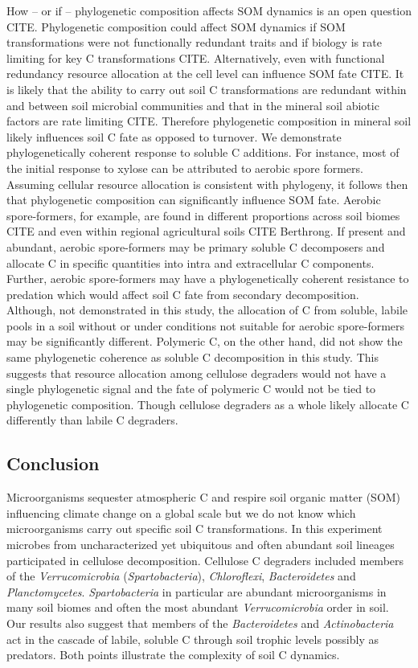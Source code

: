 How -- or if -- phylogenetic composition affects SOM dynamics is an open
question CITE. Phylogenetic composition could affect SOM dynamics if SOM
transformations were not functionally redundant traits and if biology is rate
limiting for key C transformations CITE. Alternatively, even with functional
redundancy resource allocation at the cell level can influence SOM fate CITE.
It is likely that the ability to carry out soil C transformations are redundant
within and between soil microbial communities and that in the mineral soil
abiotic factors are rate limiting CITE. Therefore phylogenetic composition in
mineral soil likely influences soil C fate as opposed to turnover. We
demonstrate phylogenetically coherent response to soluble C additions. For
instance, most of the initial response to xylose can be attributed to aerobic
spore formers. Assuming cellular resource allocation is consistent with
phylogeny, it follows then that phylogenetic composition can significantly
influence SOM fate. Aerobic spore-formers, for example, are found in different
proportions across soil biomes CITE and even within regional agricultural soils
CITE Berthrong. If present and abundant, aerobic spore-formers may be primary
soluble C decomposers and allocate C in specific quantities into intra and
extracellular C components. Further, aerobic spore-formers may have
a phylogenetically coherent resistance to predation which would affect soil
C fate from secondary decomposition. Although, not demonstrated in this study,
the allocation of C from soluble, labile pools in a soil without or under
conditions not suitable for aerobic spore-formers may be significantly
different. Polymeric C, on the other hand, did not show the same phylogenetic
coherence as soluble C decomposition in this study. This suggests that resource
allocation among cellulose degraders would not have a single phylogenetic
signal and the fate of polymeric C would not be tied to phylogenetic
composition. Though cellulose degraders as a whole likely allocate
C differently than labile C degraders.

\subsection{Conclusion} 
Microorganisms sequester atmospheric C and respire soil organic matter (SOM)
influencing climate change on a global scale but we do not know which
microorganisms carry out specific soil C transformations. In this experiment
microbes from uncharacterized yet ubiquitous and often abundant soil lineages
participated in cellulose decomposition. Cellulose C degraders included members
of the \textit{Verrucomicrobia} (\textit{Spartobacteria}),
\textit{Chloroflexi}, \textit{Bacteroidetes} and \textit{Planctomycetes}.
\textit{Spartobacteria} in particular are abundant microorganisms in many soil
biomes and often the most abundant \textit{Verrucomicrobia} order in soil. Our
results also suggest that members of the \textit{Bacteroidetes} and
\textit{Actinobacteria} act in the cascade of labile, soluble C through soil
trophic levels possibly as predators. Both points illustrate the complexity of
soil C dynamics.
